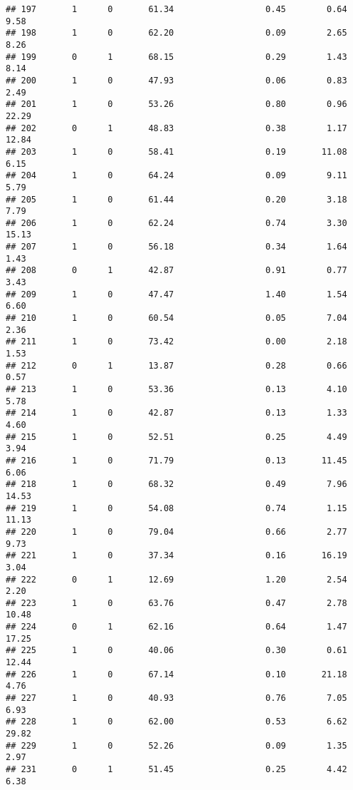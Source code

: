 \documentclass[
]{article}
\begin{document}
\begin{verbatim}
## 197       1      0       61.34                  0.45        0.64        9.58
## 198       1      0       62.20                  0.09        2.65        8.26
## 199       0      1       68.15                  0.29        1.43        8.14
## 200       1      0       47.93                  0.06        0.83        2.49
## 201       1      0       53.26                  0.80        0.96       22.29
## 202       0      1       48.83                  0.38        1.17       12.84
## 203       1      0       58.41                  0.19       11.08        6.15
## 204       1      0       64.24                  0.09        9.11        5.79
## 205       1      0       61.44                  0.20        3.18        7.79
## 206       1      0       62.24                  0.74        3.30       15.13
## 207       1      0       56.18                  0.34        1.64        1.43
## 208       0      1       42.87                  0.91        0.77        3.43
## 209       1      0       47.47                  1.40        1.54        6.60
## 210       1      0       60.54                  0.05        7.04        2.36
## 211       1      0       73.42                  0.00        2.18        1.53
## 212       0      1       13.87                  0.28        0.66        0.57
## 213       1      0       53.36                  0.13        4.10        5.78
## 214       1      0       42.87                  0.13        1.33        4.60
## 215       1      0       52.51                  0.25        4.49        3.94
## 216       1      0       71.79                  0.13       11.45        6.06
## 218       1      0       68.32                  0.49        7.96       14.53
## 219       1      0       54.08                  0.74        1.15       11.13
## 220       1      0       79.04                  0.66        2.77        9.73
## 221       1      0       37.34                  0.16       16.19        3.04
## 222       0      1       12.69                  1.20        2.54        2.20
## 223       1      0       63.76                  0.47        2.78       10.48
## 224       0      1       62.16                  0.64        1.47       17.25
## 225       1      0       40.06                  0.30        0.61       12.44
## 226       1      0       67.14                  0.10       21.18        4.76
## 227       1      0       40.93                  0.76        7.05        6.93
## 228       1      0       62.00                  0.53        6.62       29.82
## 229       1      0       52.26                  0.09        1.35        2.97
## 231       0      1       51.45                  0.25        4.42        6.38

\end{verbatim}
\end{document}
